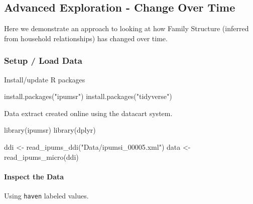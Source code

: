 \documentclass[
]{book}
\newenvironment{Shaded}{\begin{snugshade}}{\end{snugshade}}
\newcommand{\DecValTok}[1]{\textcolor[rgb]{0.00,0.00,0.81}{#1}}
\newcommand{\FunctionTok}[1]{\textcolor[rgb]{0.00,0.00,0.00}{#1}}
\newcommand{\NormalTok}[1]{#1}
\newcommand{\OtherTok}[1]{\textcolor[rgb]{0.56,0.35,0.01}{#1}}
\newcommand{\SpecialCharTok}[1]{\textcolor[rgb]{0.00,0.00,0.00}{#1}}
\newcommand{\StringTok}[1]{\textcolor[rgb]{0.31,0.60,0.02}{#1}}
\begin{document}
\hypertarget{advanced-exploration---change-over-time}{%
\subsection{Advanced Exploration - Change Over Time}\label{advanced-exploration---change-over-time}}

Here we demonstrate an approach to looking at how Family Structure (inferred from household relationships) has changed over time.

\hypertarget{setup-load-data}{%
\subsubsection{Setup / Load Data}\label{setup-load-data}}

Install/update R packages

\begin{Shaded}
\begin{Highlighting}[]
\FunctionTok{install.packages}\NormalTok{(}\StringTok{"ipumsr"}\NormalTok{)}
\FunctionTok{install.packages}\NormalTok{(}\StringTok{"tidyverse"}\NormalTok{)}
\end{Highlighting}
\end{Shaded}

Data extract created online using the datacart system.

\begin{Shaded}
\begin{Highlighting}[]
\FunctionTok{library}\NormalTok{(ipumsr)}
\FunctionTok{library}\NormalTok{(dplyr)}


\NormalTok{ddi }\OtherTok{\textless{}{-}} \FunctionTok{read\_ipums\_ddi}\NormalTok{(}\StringTok{"Data/ipumsi\_00005.xml"}\NormalTok{)}
\NormalTok{data }\OtherTok{\textless{}{-}} \FunctionTok{read\_ipums\_micro}\NormalTok{(ddi)}
\end{Highlighting}
\end{Shaded}

\hypertarget{inspect-the-data}{%
\paragraph{Inspect the Data}\label{inspect-the-data}}

Using \texttt{haven} labeled values.

\begin{Shaded}
\end{Shaded}
\end{document}

